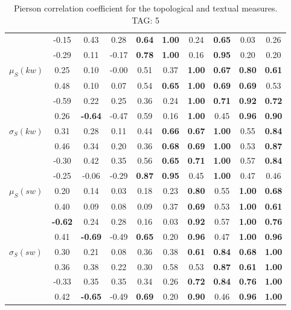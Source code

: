 \begin{table*}[h!]
\begin{center}
\begin{tabular}{| l || c | c | c | c | c | c | c | c | c |}
 & -0.15 & 0.43 & 0.28 & {\bf 0.64} & {\bf 1.00} & 0.24 & {\bf 0.65} & 0.03 & 0.26 \\
 & -0.29 & 0.11 & -0.17 & {\bf 0.78} & {\bf 1.00} & 0.16 & {\bf 0.95} & 0.20 & 0.20 \\\hline
$\mu_S(kw)$ & 0.25 & 0.10 & -0.00 & 0.51 & 0.37 & {\bf 1.00} & {\bf 0.67} & {\bf 0.80} & {\bf 0.61} \\
 & 0.48 & 0.10 & 0.07 & 0.54 & {\bf 0.65} & {\bf 1.00} & {\bf 0.69} & {\bf 0.69} & 0.53 \\
 & -0.59 & 0.22 & 0.25 & 0.36 & 0.24 & {\bf 1.00} & {\bf 0.71} & {\bf 0.92} & {\bf 0.72} \\
 & 0.26 & {\bf -0.64} & -0.47 & 0.59 & 0.16 & {\bf 1.00} & 0.45 & {\bf 0.96} & {\bf 0.90} \\\hline
$\sigma_S(kw)$ & 0.31 & 0.28 & 0.11 & 0.44 & {\bf 0.66} & {\bf 0.67} & {\bf 1.00} & 0.55 & {\bf 0.84} \\
 & 0.46 & 0.34 & 0.20 & 0.36 & {\bf 0.68} & {\bf 0.69} & {\bf 1.00} & 0.53 & {\bf 0.87} \\
 & -0.30 & 0.42 & 0.35 & 0.56 & {\bf 0.65} & {\bf 0.71} & {\bf 1.00} & 0.57 & {\bf 0.84} \\
 & -0.25 & -0.06 & -0.29 & {\bf 0.87} & {\bf 0.95} & 0.45 & {\bf 1.00} & 0.47 & 0.46 \\\hline
$\mu_S(sw)$ & 0.20 & 0.14 & 0.03 & 0.18 & 0.23 & {\bf 0.80} & 0.55 & {\bf 1.00} & {\bf 0.68} \\
 & 0.40 & 0.09 & 0.08 & 0.09 & 0.37 & {\bf 0.69} & 0.53 & {\bf 1.00} & {\bf 0.61} \\
 & {\bf -0.62} & 0.24 & 0.28 & 0.16 & 0.03 & {\bf 0.92} & 0.57 & {\bf 1.00} & {\bf 0.76} \\
 & 0.41 & {\bf -0.69} & -0.49 & {\bf 0.65} & 0.20 & {\bf 0.96} & 0.47 & {\bf 1.00} & {\bf 0.96} \\\hline
$\sigma_S(sw)$ & 0.30 & 0.21 & 0.08 & 0.36 & 0.38 & {\bf 0.61} & {\bf 0.84} & {\bf 0.68} & {\bf 1.00} \\
 & 0.36 & 0.38 & 0.22 & 0.30 & 0.58 & 0.53 & {\bf 0.87} & {\bf 0.61} & {\bf 1.00} \\
 & -0.33 & 0.35 & 0.35 & 0.34 & 0.26 & {\bf 0.72} & {\bf 0.84} & {\bf 0.76} & {\bf 1.00} \\
 & 0.42 & {\bf -0.65} & -0.49 & {\bf 0.69} & 0.20 & {\bf 0.90} & 0.46 & {\bf 0.96} & {\bf 1.00} \\\hline
\end{tabular}
\caption{Pierson correlation coefficient for the topological and textual measures. TAG: 5}
\end{center}
\end{table*}